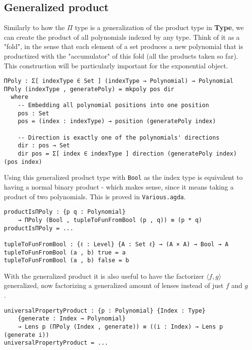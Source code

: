 \subsection{Generalized product}
Similarly to how the $\Pi$ type is a generalization of the product type in \textbf{Type}, we can create the product of all polynomials indexed by any type. Think of it as a "fold", in the sense that each element of a set produces a new polynomial that is productized with the "accumulator" of this fold (all the products taken so far). This construction will be particularly important for the exponential object.

\begin{verbatim}
ΠPoly : Σ[ indexType ∈ Set ] (indexType → Polynomial) → Polynomial
ΠPoly (indexType , generatePoly) = mkpoly pos dir
  where
    -- Embedding all polynomial positions into one position
    pos : Set
    pos = (index : indexType) → position (generatePoly index)

    -- Direction is exactly one of the polynomials' directions
    dir : pos → Set
    dir pos = Σ[ index ∈ indexType ] direction (generatePoly index) (pos index) 
\end{verbatim}

Using this generalized product type with \texttt{Bool} as the index type is equivalent to having a normal binary product - which makes sense, since it means taking a product of two polynomials. This is proved in \texttt{Various.agda}.

\begin{verbatim}
productIsΠPoly : {p q : Polynomial}
    → ΠPoly (Bool , tupleToFunFromBool (p , q)) ≡ (p * q) 
productIsΠPoly = ...

tupleToFunFromBool : {ℓ : Level} {A : Set ℓ} → (A × A) → Bool → A
tupleToFunFromBool (a , b) true = a
tupleToFunFromBool (a , b) false = b
\end{verbatim}

With the generalized product it is also useful to have the factorizer $\langle f,g \rangle$ generalized, now factorizing a generalized amount of lenses instead of just $f$ and $g$.

\begin{verbatim}
universalPropertyProduct : {p : Polynomial} {Index : Type} 
    {generate : Index → Polynomial}
    → Lens p (ΠPoly (Index , generate)) ≡ ((i : Index) → Lens p (generate i))
universalPropertyProduct = ...
\end{verbatim}

